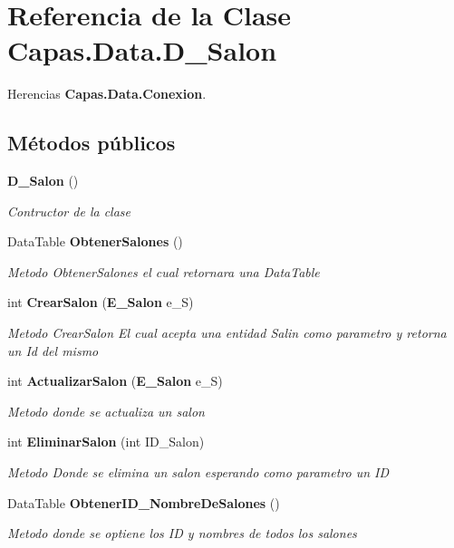 \section{Referencia de la Clase Capas.\+Data.\+D\+\_\+\+Salon}
\label{class_capas_1_1_data_1_1_d___salon}


Herencias {\bf Capas.\+Data.\+Conexion}.

\subsection*{Métodos públicos}
\begin{DoxyCompactItemize}
\item 
{\bf D\+\_\+\+Salon} ()
\begin{DoxyCompactList}\small\item\em Contructor de la clase \end{DoxyCompactList}\item 
Data\+Table {\bf Obtener\+Salones} ()
\begin{DoxyCompactList}\small\item\em Metodo Obtener\+Salones el cual retornara una Data\+Table \end{DoxyCompactList}\item 
int {\bf Crear\+Salon} ({\bf E\+\_\+\+Salon} e\+\_\+S)
\begin{DoxyCompactList}\small\item\em Metodo Crear\+Salon El cual acepta una entidad Salin como parametro y retorna un Id del mismo \end{DoxyCompactList}\item 
int {\bf Actualizar\+Salon} ({\bf E\+\_\+\+Salon} e\+\_\+S)
\begin{DoxyCompactList}\small\item\em Metodo donde se actualiza un salon \end{DoxyCompactList}\item 
int {\bf Eliminar\+Salon} (int I\+D\+\_\+\+Salon)
\begin{DoxyCompactList}\small\item\em Metodo Donde se elimina un salon esperando como parametro un ID \end{DoxyCompactList}\item 
Data\+Table {\bf Obtener\+I\+D\+\_\+\+Nombre\+De\+Salones} ()
\begin{DoxyCompactList}\small\item\em Metodo donde se optiene los ID y nombres de todos los salones \end{DoxyCompactList}\item 

\end{DoxyCompactItemize}
